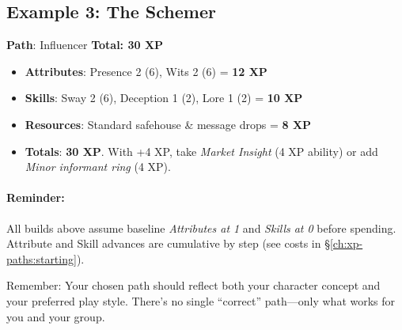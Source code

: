 \begin{multicols}{2}
\subsection*{Example 3: The Schemer}
\textbf{Path}: Influencer \quad \textbf{Total: 30 XP}
\begin{itemize}
\item \textbf{Attributes}: Presence 2 (6), Wits 2 (6) = \textbf{12 XP}
\item \textbf{Skills}: Sway 2 (6), Deception 1 (2), Lore 1 (2) = \textbf{10 XP}
\item \textbf{Resources}: Standard safehouse \& message drops = \textbf{8 XP}
\item \textbf{Totals}: \textbf{30 XP}. With +4 XP, take \emph{Market Insight} (4 XP ability) or add \emph{Minor informant ring} (4 XP).
\end{itemize}

\paragraph{Reminder:}
All builds above assume baseline \emph{Attributes at 1} and \emph{Skills at 0} before spending. Attribute and Skill advances are cumulative by step (see costs in \S\ref{ch:xp-paths:starting}).

Remember: Your chosen path should reflect both your character concept and your preferred play style. There's no single ``correct'' path—only what works for you and your group.

\end{multicols}

